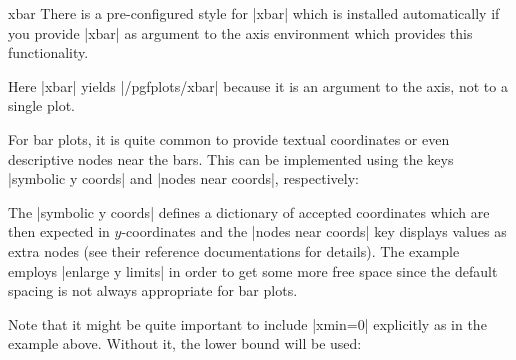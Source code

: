 {\begin{plottype}{xbar}
    There is a pre-configured style for |xbar| which is installed automatically
    if you provide |xbar| as argument to the axis environment which provides
    this functionality.
\begin{codeexample}[]
\end{codeexample}
    Here |xbar| yields |/pgfplots/xbar| because it is an argument to the axis,
    not to a single plot.

    For bar plots, it is quite common to provide textual coordinates or even
    descriptive nodes near the bars. This can be implemented using the keys
    |symbolic y coords| and |nodes near coords|, respectively:
\begin{codeexample}[]
\end{codeexample}
    The |symbolic y coords| defines a dictionary of accepted coordinates which
    are then expected in $y$-coordinates and the |nodes near coords| key
    displays values as extra nodes (see their reference documentations for
    details). The example employs |enlarge y limits| in order to get some more
    free space since the default spacing is not always appropriate for bar
    plots.

    Note that it might be quite important to include |xmin=0| explicitly as in
    the example above. Without it, the lower bound will be used:
\begin{codeexample}[]
\end{codeexample}


\end{plottype}}
